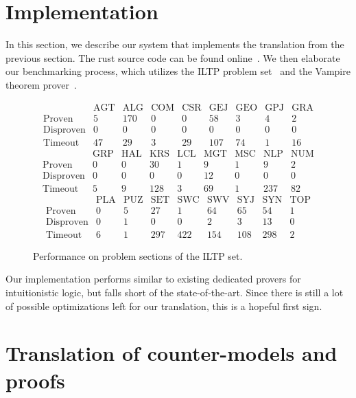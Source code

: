 \documentclass[a4paper,11pt]{report}
\theoremstyle{definition}
\theoremstyle{definition}
\theoremstyle{definition}
\theoremstyle{definition}
\theoremstyle{definition}
\theoremstyle{definition}
\theoremstyle{definition}
\begin{document}
	\section{Implementation}
	
	In this section, we describe our system that implements the translation from the previous section. The rust source code can be found online~\cite{implementation}. We then elaborate our benchmarking process, which utilizes the ILTP problem set~\cite{iltp} and the Vampire theorem prover~\cite{Kov_cs_2013}.
	
		
	\begin{figure}[h]\label{results}
		$$\begin{matrix}
			&\text{AGT}&\text{ALG}&\text{COM}&\text{CSR}&\text{GEJ}&\text{GEO}&\text{GPJ}&\text{GRA}\\
			\text{Proven}&5&170&0&0&58&3&4&2\\
			\text{Disproven}&0&0&0&0&0&0&0&0\\
			\text{Timeout}&47&29&3&29&107&74&1&16
		\end{matrix}$$
		$$\begin{matrix}
			&\text{GRP}&\text{HAL}&\text{KRS}&\text{LCL}&\text{MGT}&\text{MSC}&\text{NLP}&\text{NUM}\\
			\text{Proven}&0&0&30&1&9&1&9&2\\
			\text{Disproven}&0&0&0&0&12&0&0&0\\
			\text{Timeout}&5&9&128&3&69&1&237&82
		\end{matrix}$$
		$$\begin{matrix}
			&\text{PLA}&\text{PUZ}&\text{SET}&\text{SWC}&\text{SWV}&\text{SYJ}&\text{SYN}&\text{TOP}\\
			\text{Proven}&0&5&27&1&64&65&54&1\\
			\text{Disproven}&0&1&0&0&2&3&13&0\\
			\text{Timeout}&6&1&297&422&154&108&298&2
		\end{matrix}$$
		\caption{Performance on problem sections of the ILTP set.}
	\end{figure}
	
	Our implementation performs similar to existing dedicated provers for intuitionistic logic, but falls short of the state-of-the-art. Since there is still a lot of possible optimizations left for our translation, this is a hopeful first sign.
	
	\section{Translation of counter-models and proofs}
	
\end{document}
